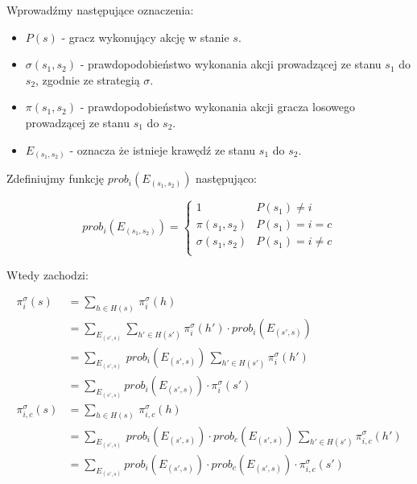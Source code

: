 \documentclass[magisterska]{pracamgr}
\begin{document}
\noindent
Wprowadźmy następujące oznaczenia:

\begin{itemize}
\item $P(s)$ - gracz wykonujący akcję w stanie $s$.
\item $\sigma(s_1, s_2)$ - prawdopodobieństwo wykonania akcji prowadzącej ze stanu $s_1$ do $s_2$, zgodnie ze strategią $\sigma$.
\item $\pi(s_1, s_2)$ - prawdopodobieństwo wykonania akcji gracza losowego prowadzącej ze stanu $s_1$ do $s_2$.
\item $E_{(s_1, s_2)}$ - oznacza że istnieje krawędź ze stanu $s_1$ do $s_2$.
\end{itemize}

\noindent
Zdefiniujmy funkcję $prob_i(E_{(s_1, s_2)})$ następująco:

\begin{equation*}
prob_i(E_{(s_1, s_2)}) = \begin{cases}
                            1                & P(s_1) \neq i     \\
                            \pi(s_1, s_2)    & P(s_1) = i = c    \\
                            \sigma(s_1, s_2) & P(s_1) = i \neq c \\
                          \end{cases}
\end{equation*}

\noindent
Wtedy zachodzi:

\begin{align*}
\pi_i^{\sigma}(s) &= \sum\limits_{h \in H(s)} \, \pi_i^{\sigma}(h) \\
                  &= \sum\limits_{E_{(s', s)}} \sum\limits_{h' \in H(s')} \pi_i^{\sigma}(h') \cdot prob_i(E_{(s', s)}) \\
                  &= \sum\limits_{E_{(s', s)}} \, prob_i(E_{(s', s)}) \, \sum\limits_{h' \in H(s')} \pi_i^{\sigma}(h')  \\
                  &= \sum\limits_{E_{(s', s)}} prob_i(E_{(s', s)}) \cdot \pi_i^{\sigma}(s')\\
\pi_{i, c}^{\sigma}(s) &= \sum\limits_{h \in H(s)} \, \pi_{i, c}^{\sigma}(h) \\
                       &= \sum\limits_{E_{(s', s)}} \, prob_i(E_{(s', s)}) \cdot prob_c(E_{(s', s)}) \, \sum\limits_{h' \in H(s')} \pi_{i, c}^{\sigma}(h') \\
                       &= \sum\limits_{E_{(s', s)}} prob_i(E_{(s', s)}) \cdot prob_c(E_{(s', s)}) \cdot \pi_{i, c}^{\sigma}(s') 
\end{align*}
\end{document}
